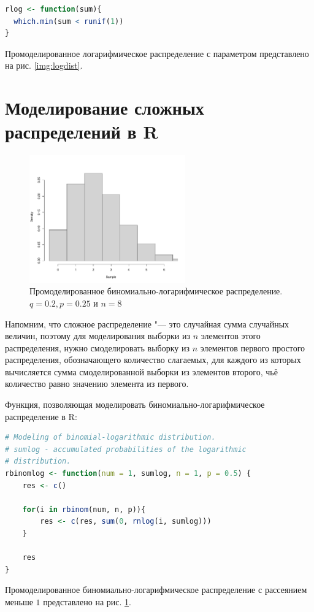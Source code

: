\documentclass[12pt, specialist, subf, substylefile = spbu_report.rtx]{disser}
\begin{document}
	\begin{lstlisting}[language=R]
rlog <- function(sum){
  which.min(sum < runif(1))
}
	\end{lstlisting}	
	
	Промоделированное логарифмическое распределение с параметром представлено на рис. \ref{img:logdist}.
	
	\section{Моделирование сложных распределений в R}
	
	\begin{figure}[ht]
		\centering
		\includegraphics[width = 0.6\textwidth]{binlogsample}
		\caption{Промоделированное биномиально-логарифмическое распределение. $ q = 0.2, p = 0.25 $ и $ n = 8 $}
		\label{img:binlogsample}
	\end{figure}
	
	Напомним, что сложное распределение "--- это случайная сумма случайных величин, поэтому для моделирования выборки из $ n $ элементов этого распределения, нужно смоделировать выборку из $ n $ элементов первого простого распределения, обозначающего количество слагаемых, для каждого из которых вычисляется сумма смоделированной выборки из элементов второго, чьё количество равно значению элемента из первого.
	
	Функция, позволяющая моделировать биномиально-логарифмическое распределение в R:
	\begin{lstlisting}[language=R]
# Modeling of binomial-logarithmic distribution.
# sumlog - accumulated probabilities of the logarithmic
# distribution.
rbinomlog <- function(num = 1, sumlog, n = 1, p = 0.5) {
	res <- c()
	
	for(i in rbinom(num, n, p)){
		res <- c(res, sum(0, rnlog(i, sumlog)))
	}
	
	res
}
	\end{lstlisting}
	\label{page:Rmodel}
	Промоделированное биномиально-логарифмическое распределение с рассеянием меньше $ 1 $ представлено на рис. \ref{img:binlogsample}.
	
\end{document}
